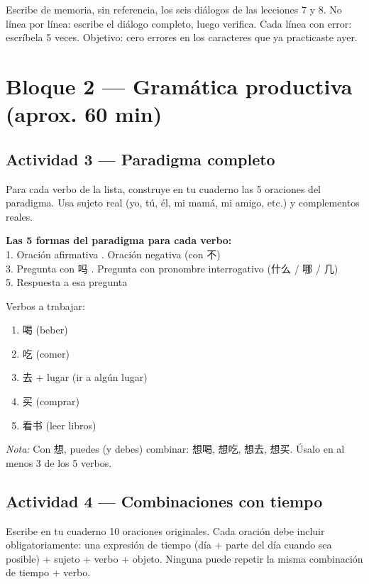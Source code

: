 \documentclass[12pt, a4paper]{article}
\begin{document}
Escribe de memoria, sin referencia, los seis diálogos de las lecciones 7 y 8. No línea por línea: escribe el diálogo completo, luego verifica. Cada línea con error: escríbela 5 veces. Objetivo: cero errores en los caracteres que ya practicaste ayer.

\section{Bloque 2 — Gramática productiva (aprox. 60 min)}

\subsection{Actividad 3 — Paradigma completo}

Para cada verbo de la lista, construye en tu cuaderno las 5 oraciones del paradigma. Usa sujeto real (yo, tú, él, mi mamá, mi amigo, etc.) y complementos reales.

\begin{cuadrogris}
\textbf{Las 5 formas del paradigma para cada verbo:}\\
1. Oración afirmativa . Oración negativa (con 不)\\
3. Pregunta con 吗 . Pregunta con pronombre interrogativo (什么 / 哪 / 几)\\
5. Respuesta a esa pregunta
\end{cuadrogris}

\noindent Verbos a trabajar:

\begin{enumerate}[leftmargin=1.5cm]
\item 喝 (beber)
\item 吃 (comer)
\item 去 + lugar (ir a algún lugar)
\item 买 (comprar)
\item 看书 (leer libros)
\end{enumerate}

\textit{Nota:} Con 想, puedes (y debes) combinar: 想喝, 想吃, 想去, 想买. Úsalo en al menos 3 de los 5 verbos.

\subsection{Actividad 4 — Combinaciones con tiempo}

Escribe en tu cuaderno 10 oraciones originales. Cada oración debe incluir obligatoriamente: una expresión de tiempo (día + parte del día cuando sea posible) + sujeto + verbo + objeto. Ninguna puede repetir la misma combinación de tiempo + verbo.
\end{document}
